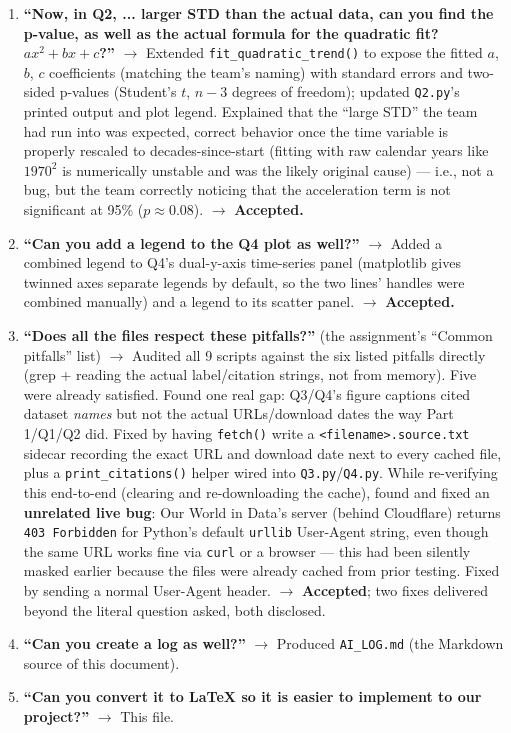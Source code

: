 \begin{enumerate}[leftmargin=*, itemsep=0.8em]
\item \textbf{``Now, in Q2, ... larger STD than the actual data, can you find the p-value,
as well as the actual formula for the quadratic fit? $ax^2 + bx + c$?''}
$\rightarrow$ Extended \texttt{fit\_quadratic\_trend()} to expose the fitted $a$, $b$, $c$
coefficients (matching the team's naming) with standard errors and two-sided p-values
(Student's $t$, $n-3$ degrees of freedom); updated \texttt{Q2.py}'s printed output and plot
legend. Explained that the ``large STD'' the team had run into was expected, correct
behavior once the time variable is properly rescaled to decades-since-start (fitting with
raw calendar years like $1970^2$ is numerically unstable and was the likely original cause)
--- i.e., not a bug, but the team correctly noticing that the acceleration term is not
significant at 95\% ($p \approx 0.08$).
$\rightarrow$ \textbf{Accepted.}

\item \textbf{``Can you add a legend to the Q4 plot as well?''}
$\rightarrow$ Added a combined legend to Q4's dual-y-axis time-series panel (matplotlib
gives twinned axes separate legends by default, so the two lines' handles were combined
manually) and a legend to its scatter panel.
$\rightarrow$ \textbf{Accepted.}

\item \textbf{``Does all the files respect these pitfalls?''} (the assignment's ``Common
pitfalls'' list)
$\rightarrow$ Audited all 9 scripts against the six listed pitfalls directly (grep + reading
the actual label/citation strings, not from memory). Five were already satisfied. Found one
real gap: Q3/Q4's figure captions cited dataset \emph{names} but not the actual
URLs/download dates the way Part 1/Q1/Q2 did. Fixed by having \texttt{fetch()} write a
\texttt{<filename>.source.txt} sidecar recording the exact URL and download date next to
every cached file, plus a \texttt{print\_citations()} helper wired into
\texttt{Q3.py}/\texttt{Q4.py}.
While re-verifying this end-to-end (clearing and re-downloading the cache), found and fixed
an \textbf{unrelated live bug}: Our World in Data's server (behind Cloudflare) returns
\texttt{403 Forbidden} for Python's default \texttt{urllib} User-Agent string, even though
the same URL works fine via \texttt{curl} or a browser --- this had been silently masked
earlier because the files were already cached from prior testing. Fixed by sending a normal
User-Agent header.
$\rightarrow$ \textbf{Accepted}; two fixes delivered beyond the literal question asked, both
disclosed.

\item \textbf{``Can you create a log as well?''}
$\rightarrow$ Produced \texttt{AI\_LOG.md} (the Markdown source of this document).

\item \textbf{``Can you convert it to LaTeX so it is easier to implement to our project?''}
$\rightarrow$ This file.

\end{enumerate}

